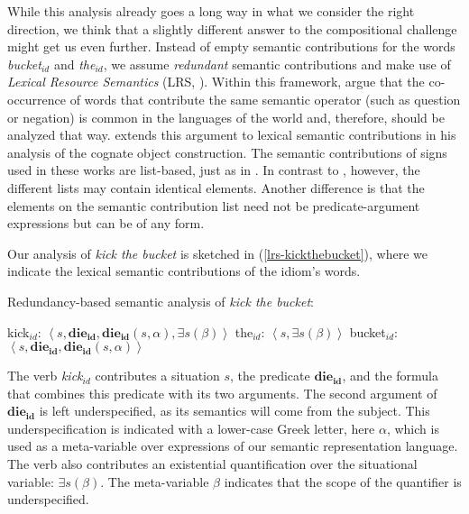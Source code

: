 \documentclass[output=paper]{langsci/langscibook}
\begin{document}
While this analysis already goes a long way in what we consider the right direction, we think that a slightly different answer to the compositional challenge might get us even further. Instead of empty semantic contributions for the words \textit{bucket$_{id}$} and \textit{the$_{id}$}, we assume \emph{redundant} semantic contributions and make use of  \emph{Lexical Resource Semantics} (LRS, \citealt{Richter:Sailer:04}). Within this framework, \cite{Richter:Sailer:01.1,Richter:Sailer:06} argue that the co-occurrence of words that contribute the same semantic operator (such as question or negation) is common in the languages of the world and, therefore, should be analyzed that way. \cite{Sailer:10} extends this argument to lexical semantic contributions in his analysis of the  cognate object construction. The semantic contributions of signs used in these works are list-based, just as in \cite{kaysagidioms}. In contrast to \cite{kaysagidioms}, however, the different lists may contain identical elements. Another dif\-ference is that the elements on the semantic contribution list need not be predicate-argument expressions but can be of any form.

Our analysis of \textit{kick the bucket} is sketched in (\ref{lrs-kickthebucket}), where we indicate the lexical semantic contributions of the idiom's words. 

\begin{exe}
\ex Redundancy-based semantic analysis of \textit{kick the bucket}:\label{lrs-kickthebucket}
\begin{xlist}
\ex kick$_{id}$: $\left< s, \mathbf{die_{id}}, \mathbf{die_{id}}(s,\alpha), \exists s (\beta) \right>$\label{lrs-kick}
\ex the$_{id}$: $\left< s, \exists s (\beta) \right>$\label{lrs-the}
\ex bucket$_{id}$: $\left< s, \mathbf{die_{id}}, \mathbf{die_{id}}(s,\alpha) \right>$\label{lrs-bucket}
\end{xlist}
\end{exe}

The verb \textit{kick$_{id}$} contributes a situation $s$, the predicate $\mathbf{die_{id}}$, and the formula that combines this predicate with its two arguments. The second argument of $\mathbf{die_{id}}$ is left  underspecified, as its semantics will come from the subject. This under\-specification is indicated with a lower-case Greek letter, here $\alpha$, which is used as a meta-variable over expressions of our semantic representation language. The verb also contributes an existential quantification over the situational variable: $\exists s (\beta)$. The meta-variable $\beta$ indicates that the scope of the quantifier is underspecified. 
\end{document}
